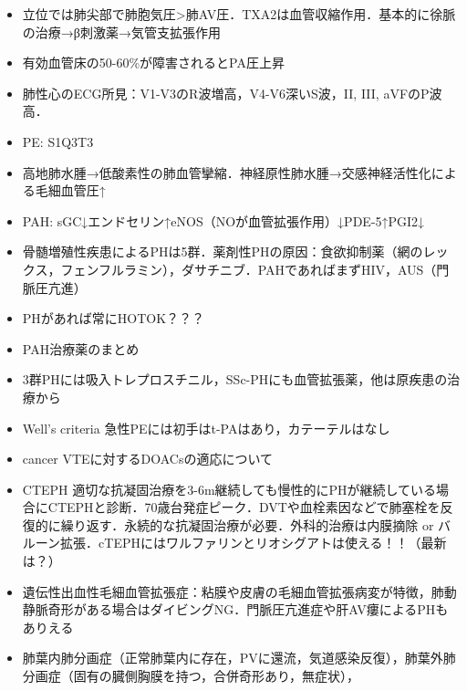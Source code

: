 \begin{itemize}
\item 立位では肺尖部で肺胞気圧>肺AV圧．TXA2は血管収縮作用．基本的に徐脈の治療→β刺激薬→気管支拡張作用
\item 有効血管床の50-60\%が障害されるとPA圧上昇
\item 肺性心のECG所見：V1-V3のR波増高，V4-V6深いS波，II, III, aVFのP波高．
\item PE: S1Q3T3
\item 高地肺水腫→低酸素性の肺血管攣縮．神経原性肺水腫→交感神経活性化による毛細血管圧↑
\item PAH: sGC↓エンドセリン↑eNOS（NOが血管拡張作用）↓PDE-5↑PGI2↓
\item 骨髄増殖性疾患によるPHは5群．薬剤性PHの原因：食欲抑制薬（網のレックス，フェンフルラミン），ダサチニブ．PAHであればまずHIV，AUS（門脈圧亢進）
\item PHがあれば常にHOTOK？？？
\item PAH治療薬のまとめ
\item 3群PHには吸入トレプロスチニル，SSc-PHにも血管拡張薬，他は原疾患の治療から
\item Well's criteria 急性PEには初手はt-PAはあり，カテーテルはなし
\item cancer VTEに対するDOACsの適応について
\item CTEPH 適切な抗凝固治療を3-6m継続しても慢性的にPHが継続している場合にCTEPHと診断．70歳台発症ピーク．DVTや血栓素因などで肺塞栓を反復的に繰り返す．永続的な抗凝固治療が必要．外科的治療は内膜摘除 or バルーン拡張．cTEPHにはワルファリンとリオシグアトは使える！！（最新は？）
\item 遺伝性出血性毛細血管拡張症：粘膜や皮膚の毛細血管拡張病変が特徴，肺動静脈奇形がある場合はダイビングNG．門脈圧亢進症や肝AV瘻によるPHもありえる
\item 肺葉内肺分画症（正常肺葉内に存在，PVに還流，気道感染反復），肺葉外肺分画症（固有の臓側胸膜を持つ，合併奇形あり，無症状），


\end{itemize}
